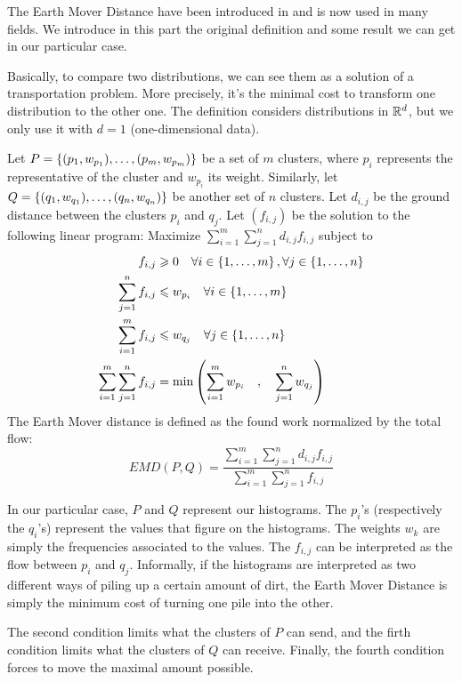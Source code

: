 The Earth Mover Distance have been introduced in \cite{EMD-def} and is now used in many fields. We introduce in this part the original definition and some result we can get in our particular case.

Basically, to compare two distributions, we can see them as a solution of a transportation problem. More precisely, it's the minimal cost to transform one distribution to the other one. The definition considers distributions in $\mathbb{R}^d$, but we only use it with $d=1$ (one-dimensional data).

\begin{definition}
	Let $P = \left\{ (p_1,w_{p_1}), \dots, (p_m,w_{p_m}) \right\}$ be a set of $m$ clusters, where $p_i$ represents the representative of the cluster and $w_{p_i}$ its weight. Similarly, let $Q = \left\{ (q_1,w_{q_1}), \dots, (q_n,w_{q_n}) \right\}$ be another set of $n$ clusters. Let $d_{i,j}$ be the ground distance between the clusters $p_i$ and $q_j$.
	Let $(f_{i,j})$ be the solution to the following linear program:
	Maximize $\sum_{i=1}^m \sum_{j=1}^n d_{i,j} f_{i,j}$ subject to
\[
    \begin{aligned}
        f_{i,j} &\geqslant 0  \quad \forall i \in \left\{ 1, \dots, m \right\}, \forall j \in \left\{ 1, \dots, n \right\} \\
        \sum_{j=1}^{n}{f_{i,j}} &\leqslant w_{p_i} \quad \forall i \in \left\{ 1, \dots, m \right\}\\
        \sum_{i=1}^{m}{f_{i,j}} &\leqslant w_{q_j} \quad \forall j \in \left\{ 1, \dots, n \right\} \\
        \sum_{i=1}^m \sum_{j=1}^n f_{i,j} &= \operatorname{min} \left( \sum_{i=1}^m w_{p_i} \quad,\quad \sum_{j=1}^n w_{q_j}\right)
    \end{aligned}
\]
The Earth Mover distance is defined as the found work normalized by the total flow:
\[
	EMD(P,Q) = \frac{\sum_{i=1}^m \sum_{j=1}^n d_{i,j} f_{i,j}}{\sum_{i=1}^m \sum_{j=1}^n f_{i,j}}
\]
\end{definition}

In our particular case, $P$ and $Q$ represent our histograms. The $p_i$'s (respectively the $q_i$'s) represent the values that figure on the histograms. The weights $w_k$ are simply the frequencies associated to the values. The $f_{i,j}$ can be interpreted as the flow between $p_i$ and $q_j$. Informally, if the histograms are interpreted as two different ways of piling up a certain amount of dirt, the Earth Mover Distance is simply the minimum cost of turning one pile into the other.

The second condition limits what the clusters of $P$ can send, and the firth condition limits what the clusters of $Q$ can receive. Finally, the fourth condition forces to move the maximal amount possible.

